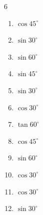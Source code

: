\begin{multicols}{6}
\begin{enumerate}
  \item $\displaystyle \cos{45^\circ}$


\columnbreak %

  \item $\displaystyle \sin{30^\circ}$


  \item $\displaystyle \sin{60^\circ}$


  \item $\displaystyle \sin{45^\circ}$


  \item $\displaystyle \sin{30^\circ}$


  \item $\displaystyle \cos{30^\circ}$


  \item $\displaystyle \tan{60^\circ}$


  \item $\displaystyle \cos{45^\circ}$


  \item $\displaystyle \sin{60^\circ}$


  \item $\displaystyle \cos{30^\circ}$


  \item $\displaystyle \cos{30^\circ}$


  \item $\displaystyle \sin{30^\circ}$



\end{enumerate}
\end{multicols}
